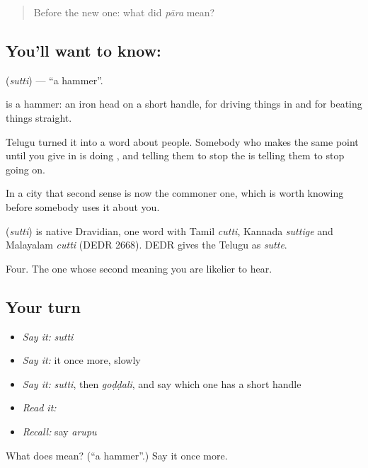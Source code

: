 \begin{quote}
Before the new one: what did \emph{pāra} mean?
\end{quote}

\subsection*{You'll want to know: }
\textbf{} (\emph{sutti}) — \textquotedblleft{}a hammer\textquotedblright{}.

 is a hammer: an iron head on a short handle, for driving things in and for beating things straight.

Telugu turned it into a word about people. Somebody who makes the same point until you give in is doing , and telling them to stop the  is telling them to stop going on.

In a city that second sense is now the commoner one, which is worth knowing before somebody uses it about you.

\begin{cousinweb}
\textbf{} (\emph{sutti}) is native Dravidian, one word with Tamil \emph{cutti}, Kannada \emph{suttige} and Malayalam \emph{cutti} (DEDR 2668). DEDR gives the Telugu as \emph{sutte}.
\end{cousinweb}

\begin{grammarlens}[title={What you've built}]
Four. The one whose second meaning you are likelier to hear.
\end{grammarlens}

\subsection*{Your turn}
\begin{itemize}
\raggedright
  \item \emph{Say it:} \emph{sutti}
  \item \emph{Say it:} it once more, slowly
  \item \emph{Say it:} \emph{sutti}, then \emph{goḍḍali}, and say which one has a short handle
  \item \emph{Read it:} \textbf{}
  \item \emph{Recall:} say \emph{arupu}
\end{itemize}

\begin{tcolorbox}[breakable,colback=teal!4,colframe=teal!35!black,title={Before you move on}]
What does  mean? (\textquotedblleft{}a hammer\textquotedblright{}.) Say it once more.
\end{tcolorbox}
